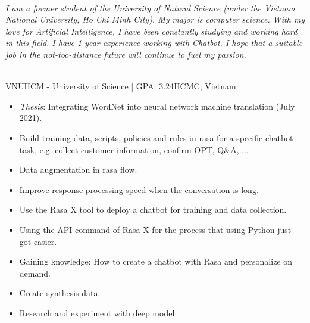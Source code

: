 \documentclass[letter]{cv-template}
\begin{document}
    \displayheader \vspace{0.25 cm}

   

    \\
        \textit{I am a former student of the University of Natural Science (under the Vietnam National University, Ho Chi Minh City). My major is computer science. With my love for Artificial Intelligence, I have been constantly studying and working hard in this field. I have 1 year experience working with Chatbot. I hope that a suitable job in the not-too-distance future will continue to fuel my passion.}\\\\


        {VNUHCM - University of Science | GPA: 3.24}{HCMC, Vietnam}{
            \begin{itemize}
                \item \textit{Thesis}: Integrating WordNet into neural network machine translation  (July 2021). 
            \end{itemize} \leavevmode
        }




       
    
        {}{
            \begin{itemize}
                \setlength\itemsep{0.25pt}
                \item Build training data, scripts,  policies and rules in rasa for a specific chatbot task, e.g. collect customer information, confirm OPT, Q\&A, ...
                \item Data augmentation in rasa flow.
                \item Improve response processing speed when the conversation is long.
                \item Use the Rasa X tool to deploy a chatbot for training and data collection.
                \item Using the API command of Rasa X for the process that using Python just got easier. 
                \item Gaining knowledge: How to create a chatbot with Rasa and personalize on demand.
            \end{itemize} \leavevmode
        }
        {}{
            \begin{itemize}
                \setlength\itemsep{0.25pt}
                \item Create synthesis data.
                \item Research and experiment with deep model
            \end{itemize} \leavevmode
        }
\end{document}
